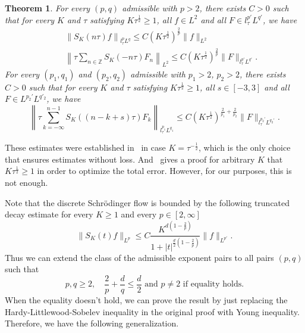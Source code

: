 \documentclass[10pt,a4paper]{article}
\newtheorem{theorem}{Theorem}[section]
\begin{document}
  \begin{theorem}\label{thmDSEold} %
    For every \((p,q)\) admissible with \(p>2\), there exists \(C>0\) such that
    for every \(K\) and \(\tau\) satisfying \(K\tau^\frac12 \geq 1\), all \(
    f \in L^2 \) and all \(F \in l^{p'}_\tau L^{q'}\), we have 
    \begin{eqnarray}
      \label{To} & & \left\| S_{K}(n \tau) f\right\|_{l^p_\tau L^q} \leq C(K\tau^\frac12)^{\frac2p} \|f\|_{L^2} \\
      \label{T*o} & & \left\| \tau\sum_{n \in \mathbb{Z}}  S_K (-n\tau) F_n \right\|_{L^2} \leq C (K\tau^\frac12)^\frac2p \|F\|_{l^{p'}_\tau L^{q'}}.
    \end{eqnarray}
    For every \((p_1, q_1)\) and \((p_2, q_2)\) admissible with \(p_1>2\),
    \(p_2>2\), there exists \(C > 0\) such that for every \(K\) and \(\tau\) 
    satisfying \(K\tau^\frac12 \geq 1\), all \( s \in [-3,3] \) and all 
    \(F \in L^{p_2'} L^{q'_2}\), we have
    \begin{equation}\label{TT*o}
      \left\| \tau \sum_{k = -\infty}^{n-1}  S_K ((n-k+s)\tau) F_k \right\|_{l^{p_1}_\tau L^{q_1}}
      \leq C (K\tau^\frac12)^{ \frac2{p_1} + \frac2{p_2} }  \|F\|_{l^{p_2'}_\tau L^{q_2'}}.
    \end{equation}
  \end{theorem}

  These estimates were established in~\cite{IgZz09} 
  in case \(K=\tau^{-\frac12}\), which is the only choice that ensures estimates 
  without loss. And~\cite{ORS21} gives a proof for arbitrary \(K\) that \(K\tau^\frac12 \geq 1\) 
  in order to optimize the total error. However, for our purposes, this is not enough.

  Note that the discrete Schr\"odinger flow is bounded by the following truncated
  decay estimate for every \(K\geq 1\) and every \(p \in [2,\infty]\)
  \[
    \|S_K(t)f\|_{L^p} \leq C \frac{K^{d(1-\frac2p)}}{1+|t|^{\frac{d}2(1-\frac2p)}} \|f\|_{L^{p'}}.
  \]
  Thus we can extend the class of the admissible exponent pairs to all pairs \((p,q)\)
  such that 
  \begin{equation}\label{weakly-admissible}
    p,q \geq 2 ,\quad \frac2p + \frac{d}q \leq \frac{d}2 \text{ and } p \neq 2 \text{ if
    equality holds.}
  \end{equation}
  When the equality doesn't hold, we can prove the result by just replacing the 
  Hardy-Littlewood-Sobelev inequality in the original proof with Young inequality. 
  Therefore, we have the following generalization.
\end{document}
